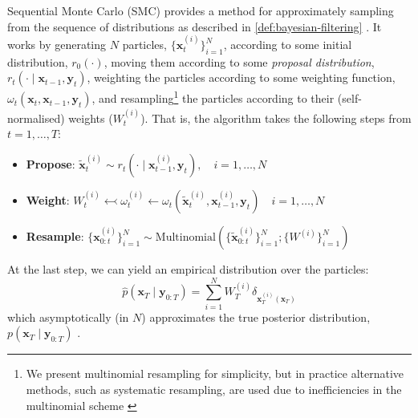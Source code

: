 \begin{definition} \label{def:smc}
    Sequential Monte Carlo (SMC) provides a method for approximately sampling from the sequence of
    distributions as described in \autoref{def:bayesian-filtering}
    \parencite{chopinIntroductionSequentialMonte2020}. It works by generating $N$ particles,
    $\{\mathbf{x}_t^{(i)}\}_{i=1}^N$, according to some initial distribution, $r_0(\cdot)$,
    moving them according to some \emph{proposal distribution},
    $r_t(\cdot \mid \mathbf{x}_{t-1}, \mathbf{y}_{t})$, weighting the particles according to
    some weighting function, $\omega_t(\mathbf{x}_t, \mathbf{x}_{t-1}, \mathbf{y}_t)$, and
    resampling\footnote{We present multinomial resampling for simplicity, but in practice
    alternative methods, such as systematic resampling, are used due to inefficiencies in the
    multinomial scheme \parencite{chopinIntroductionSequentialMonte2020}} the particles according to
    their (self-normalised) weights ($W_t^{(i)}$). That is, the algorithm takes the following steps
    from $t=1,\ldots,T$:
    \begin{itemize}
        \item \textbf{Propose}: $\tilde{\mathbf{x}}_t^{(i)} \sim r_t(\cdot \mid \mathbf{x}_{t-1}^{(i)}, \mathbf{y}_t), \quad i = 1,\ldots,N$
        \item \textbf{Weight}: $W_t^{(i)} \leftarrowtail \omega_t^{(i)} \leftarrow \omega_t(\tilde{\mathbf{x}}_t^{(i)}, \mathbf{x}_{t-1}^{(i)}, \mathbf{y}_t) \quad i = 1,\ldots,N$
        \item \textbf{Resample}: $\{\mathbf{x}_{0:t}^{(i)}\}_{i=1}^N \sim \text{Multinomial}\left(\{\tilde{\mathbf{x}}_{0:t}^{(i)}\}_{i=1}^N; \{W^{(i)}\}_{i=1}^N\right)$
    \end{itemize}
    At the last step, we can yield an empirical distribution over the particles:
    \begin{equation*}
        \hat{p}(\mathbf{x}_T \mid \mathbf{y}_{0:T}) = \sum_{i=1}^N W_{T}^{(i)}\delta_{\mathbf{x}_{T}^{(i)}(\mathbf{x}_T)}
    \end{equation*}
    which asymptotically (in $N$) approximates the true posterior distribution,
    $p(\mathbf{x}_T \mid \mathbf{y}_{0:T})$ \parencite{delmoralCentralLimitTheorems2011,chopinIntroductionSequentialMonte2020}.
\end{definition}

